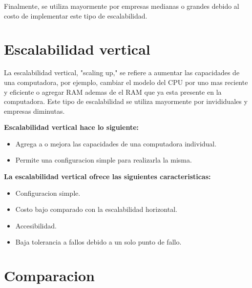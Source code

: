 \documentclass[11pt]{article}
\begin{document}
Finalmente, se utiliza mayormente por empresas medianas o grandes debido al costo de implementar este tipo de escalabilidad.

\section{Escalabilidad vertical}

La escalabilidad vertical, "scaling up," se refiere a aumentar las capacidades de una computadora, por ejemplo, cambiar el modelo del CPU por uno mas reciente y eficiente o agregar RAM ademas de el RAM que ya esta presente en la computadora. Este tipo de escalabilidad se utiliza mayormente por invididuales y empresas diminutas.
\newline

\textbf{Escalabilidad vertical hace lo siguiente:}
\begin{itemize}
	\item Agrega a o mejora las capacidades de una computadora individual.
	\item Permite una configuracion simple para realizarla la misma.
\end{itemize}

\textbf{La escalabilidad vertical ofrece las siguientes caracteristicas:}
\begin{itemize}
	\item Configuracion simple.
	\item Costo bajo comparado con la escalabilidad horizontal.
	\item Accesibilidad.
	\item Baja tolerancia a fallos debido a un solo punto de fallo.	
\end{itemize}


\section{Comparacion}
\end{document}
